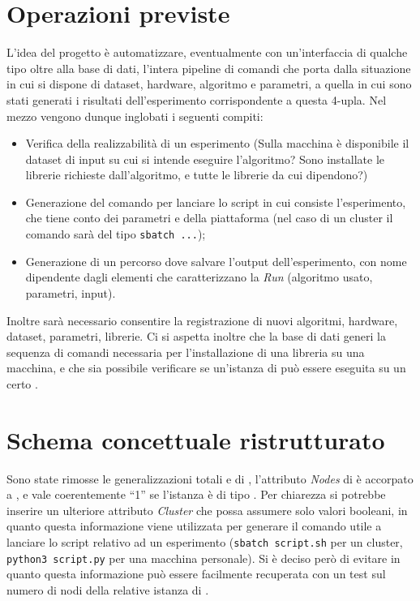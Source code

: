 \documentclass{article}
\begin{document}
\section{Operazioni previste}
L'idea del progetto è automatizzare, eventualmente con un'interfaccia di qualche tipo oltre alla base di dati, l'intera pipeline di comandi che porta dalla situazione in cui si dispone di dataset, hardware, algoritmo e parametri, a quella in cui sono stati generati i risultati dell'esperimento corrispondente a questa 4-upla. Nel mezzo vengono dunque inglobati i seguenti compiti:
\begin{itemize}
    \item Verifica della realizzabilità di un esperimento (Sulla macchina è disponibile il dataset di input su cui si intende eseguire l'algoritmo? Sono installate le librerie richieste dall'algoritmo, e tutte le librerie da cui dipendono?)
    \item Generazione del comando per lanciare lo script in cui consiste l'esperimento, che tiene conto dei parametri e della piattaforma (nel caso di un cluster il comando sarà del tipo \texttt{sbatch ...});
    \item Generazione di un percorso dove salvare l'output dell'esperimento, con nome dipendente dagli elementi che caratterizzano la \emph{Run} (algoritmo usato, parametri, input).
\end{itemize}
Inoltre sarà necessario consentire la registrazione di nuovi algoritmi, hardware, dataset, parametri, librerie. Ci si aspetta inoltre che la base di dati generi la sequenza di comandi necessaria per l'installazione di una libreria su una macchina, e che sia possibile verificare se un'istanza di  può essere eseguita su un certo .

\section{Schema concettuale ristrutturato}
Sono state rimosse le generalizzazioni totali  e  di , l'attributo \emph{Nodes} di  è accorpato a , e vale coerentemente ``1'' se l'istanza è di tipo . Per chiarezza si potrebbe inserire un ulteriore attributo \emph{Cluster} che possa assumere solo valori booleani, in quanto questa informazione viene utilizzata per generare il comando utile a lanciare lo script relativo ad un esperimento (\texttt{sbatch script.sh} per un cluster, \texttt{python3 script.py} per una macchina personale). Si è deciso però di evitare in quanto questa informazione può essere facilmente recuperata con un test sul numero di nodi della relative istanza di .
\end{document}
